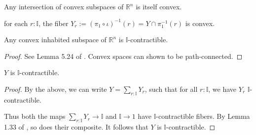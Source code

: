 \documentclass{../util/zariski}
\begin{document}
\begin{remark}
  Any intersection of convex subspaces of $\mathbb R^n$ is itself convex. 
\end{remark}
\begin{corollary}
  for each $r:\mathbb I$, the fiber 
  $Y_r:=(\pi_1\circ \iota)^{-1}(r) = Y\cap \pi_1^{-1}(r)$ is convex. 
\end{corollary}
\begin{lemma}
  Any convex inhabited subspace of $\mathbb R^n$ is $\mathbb I$-contractible. 
\end{lemma} 
\begin{proof}
  See Lemma 5.24 of \cite{synthetic-stone-duality}. 
  Convex spaces can shown to be path-connected.
\end{proof}
\begin{theorem}
  $Y$ is $\mathbb I$-contractible. 
\end{theorem}
\begin{proof}
  By the above, we can write $Y = \sum\limits_{r:\mathbb I} Y_r$, 
  such that for all $r:\mathbb I$, we have 
  $Y_r$ $\mathbb I$-contractible. 

  Thus both the maps $\sum\limits_{r:\mathbb I} Y_r \to \mathbb I$ and 
  $\mathbb I \to 1$ have $\mathbb I$-contractible fibers. 
  By Lemma 1.33 of \cite{modalities}, so does their composite. 
  It follows that $Y$ is $\mathbb I$-contractible. 
\end{proof}
\printbibliography
\end{document}
